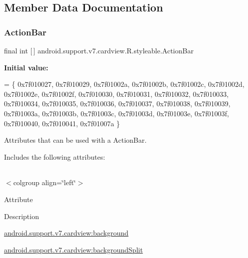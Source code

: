 \subsection{Member Data Documentation}
\mbox{\label{classandroid_1_1support_1_1v7_1_1cardview_1_1R_1_1styleable_a0cbf7f776e31f78bb0a2b558daf176f8}} 
\subsubsection{\texorpdfstring{Action\+Bar}{ActionBar}}
{\footnotesize\ttfamily final int \mbox{[}$\,$\mbox{]} android.\+support.\+v7.\+cardview.\+R.\+styleable.\+Action\+Bar\hspace{0.3cm}{\ttfamily [static]}}

{\bfseries Initial value\+:}
\begin{DoxyCode}
= \{
            0x7f010027, 0x7f010029, 0x7f01002a, 0x7f01002b,
            0x7f01002c, 0x7f01002d, 0x7f01002e, 0x7f01002f,
            0x7f010030, 0x7f010031, 0x7f010032, 0x7f010033,
            0x7f010034, 0x7f010035, 0x7f010036, 0x7f010037,
            0x7f010038, 0x7f010039, 0x7f01003a, 0x7f01003b,
            0x7f01003c, 0x7f01003d, 0x7f01003e, 0x7f01003f,
            0x7f010040, 0x7f010041, 0x7f01007a
        \}
\end{DoxyCode}
Attributes that can be used with a Action\+Bar. 

Includes the following attributes\+:

\tabulinesep=1mm
\begin{longtabu} spread 0pt [c]{*{0}{|X[-1]}|}
\hline
\end{longtabu}
$<$colgroup align=\char`\"{}left\char`\"{}$>$ 

Attribute

Description 

{\ttfamily \hyperlink{classandroid_1_1support_1_1v7_1_1cardview_1_1R_1_1styleable_ab3e16d6ff13e6ecbe49a20c53d18a111}{android.\+support.\+v7.\+cardview\+:background}}

{\ttfamily \hyperlink{classandroid_1_1support_1_1v7_1_1cardview_1_1R_1_1styleable_a31aed5097d7cbebad3a2c4f5a9cee19a}{android.\+support.\+v7.\+cardview\+:background\+Split}}

